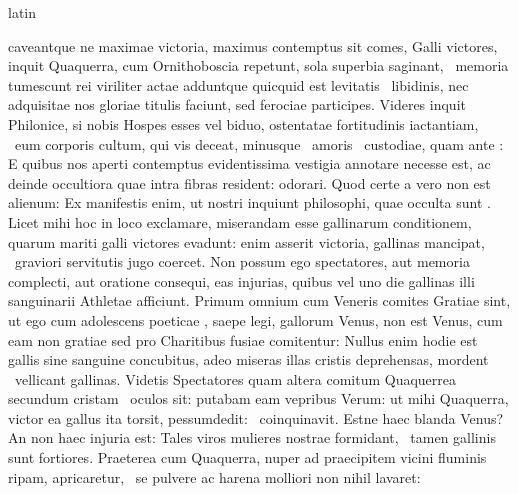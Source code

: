 \documentclass[12pt]{book}
\renewenvironment{latin}
    	{\begin{hyphenrules}{latin}}
    	{\end{hyphenrules}}
\begin{document}
\begin{pages}
\begin{latin}
\begin{Leftside}
                    caveantque ne maximae victoria, maximus contemptus sit comes, Galli victores, inquit Quaquerra, 
                    cum Ornithoboscia repetunt, sola superbia saginant,  \ampersand\ memoria tumescunt rei viriliter actae adduntque 
                    quicquid est levitatis  \ampersand\ libidinis, nec adquisitae nos gloriae titulis faciunt, sed ferociae participes. 
                    Videres inquit Philonice, si nobis Hospes esses vel biduo, ostentatae fortitudinis iactantiam,  \ampersand\ eum corporis cultum, 
                    qui vis  deceat, minusque  \ampersand\ amoris    \ampersand\ custodiae, quam ante : 
                    E quibus nos aperti contemptus evidentissima vestigia annotare necesse est, ac deinde  occultiora quae intra fibras resident: odorari. 
                    Quod certe a vero non est alienum: 
                    Ex manifestis enim, ut nostri inquiunt philosophi, quae occulta sunt . 
                    Licet mihi hoc in loco exclamare, miserandam esse gallinarum conditionem, quarum mariti galli victores evadunt: 
                     enim asserit victoria, gallinas mancipat,  \ampersand\ graviori servitutis jugo coercet. 
                    Non possum ego spectatores, aut memoria complecti, aut oratione consequi, eas injurias, quibus vel uno die gallinas illi sanguinarii Athletae afficiunt. 
                    Primum omnium cum Veneris comites Gratiae sint, ut ego cum adolescens poeticae , saepe legi, gallorum Venus, non est Venus, cum eam non gratiae sed pro Charitibus fusiae comitentur: 
                    Nullus enim hodie est gallis sine sanguine concubitus, adeo miseras illas cristis deprehensas, mordent  \ampersand\ vellicant gallinas. 
                    Videtis Spectatores quam altera comitum Quaquerrea secundum cristam  \ampersand\ oculos  sit: 
                    putabam eam vepribus  Verum: 
                    ut mihi  Quaquerra, victor ea gallus ita torsit, pessumdedit:  \ampersand\ coinquinavit. 
                    Estne haec blanda Venus? 
                    An non haec injuria est: Tales viros mulieres nostrae formidant,  \ampersand\ tamen gallinis sunt fortiores. 
                    Praeterea cum Quaquerra, nuper ad praecipitem vicini fluminis ripam, apricaretur,  \ampersand\ se pulvere ac harena molliori non nihil lavaret: 

\end{Leftside}
\end{latin}
\end{pages}
\end{document}
